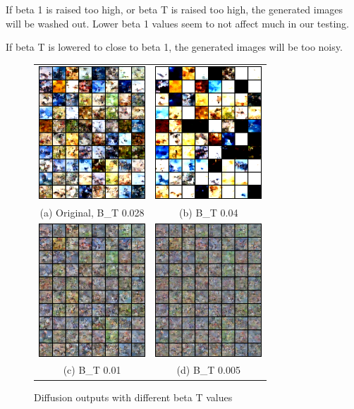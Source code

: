 \documentclass[conference]{IEEEtran}
\begin{document}
If beta 1 is raised too high, or beta T is raised too high, the generated images will be washed out. Lower beta 1 values seem to not affect much in our testing.

If beta T is lowered to close to beta 1, the generated images will be too noisy.

\begin{figure}
  \begin{tabular}{cc}
    \includegraphics[width=40mm]{./images/output/original.png} 
&   \includegraphics[width=40mm]{./images/output/bt004.png} 
\\
  (a) Original, B\_T 0.028 
  & (b) B\_T 0.04 \\[6pt]
      \includegraphics[width=40mm]{./images/output/bt01.png} 
  &  \includegraphics[width=40mm]{./images/output/bt005.png} 
\\
  (c) B\_T 0.01 & (d) B\_T 0.005 \\[6pt]
  \end{tabular}
  \caption{Diffusion outputs with different beta T values}
\end{figure}
\end{document}
